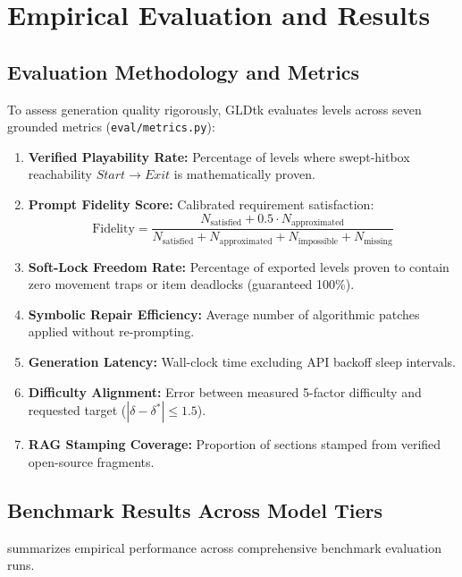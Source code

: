 \documentclass[11pt,a4paper]{report}
\theoremstyle{definition}
\theoremstyle{remark}
\begin{document}
\chapter{Empirical Evaluation and Results}
\label{chap:results}

\section{Evaluation Methodology and Metrics}
To assess generation quality rigorously, GLDtk evaluates levels across seven grounded metrics (\texttt{eval/metrics.py}):
\begin{enumerate}
    \item \textbf{Verified Playability Rate:} Percentage of levels where swept-hitbox reachability $Start \to Exit$ is mathematically proven.
    \item \textbf{Prompt Fidelity Score:} Calibrated requirement satisfaction:
    \begin{equation}
        \text{Fidelity} = \frac{N_{\text{satisfied}} + 0.5 \cdot N_{\text{approximated}}}{N_{\text{satisfied}} + N_{\text{approximated}} + N_{\text{impossible}} + N_{\text{missing}}}
    \end{equation}
    \item \textbf{Soft-Lock Freedom Rate:} Percentage of exported levels proven to contain zero movement traps or item deadlocks (guaranteed 100\%).
    \item \textbf{Symbolic Repair Efficiency:} Average number of algorithmic patches applied without re-prompting.
    \item \textbf{Generation Latency:} Wall-clock time excluding API backoff sleep intervals.
    \item \textbf{Difficulty Alignment:} Error between measured 5-factor difficulty and requested target ($|\delta - \delta^*| \le 1.5$).
    \item \textbf{RAG Stamping Coverage:} Proportion of sections stamped from verified open-source fragments.
\end{enumerate}

\section{Benchmark Results Across Model Tiers}
 summarizes empirical performance across comprehensive benchmark evaluation runs.
\end{document}
